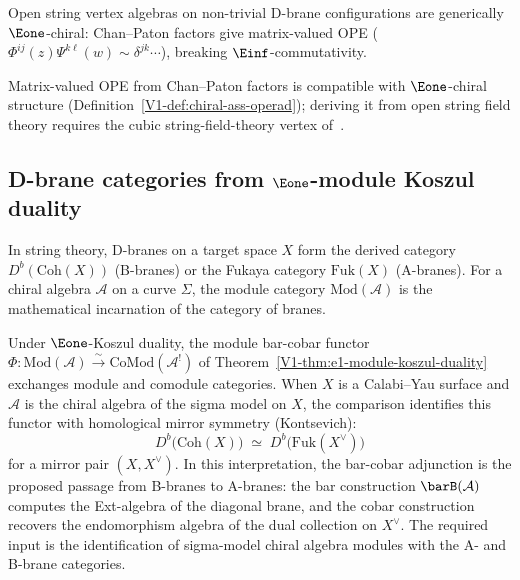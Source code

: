 \begin{remark}
Open string vertex algebras on non-trivial D-brane configurations are generically $\Eone$-chiral: Chan--Paton factors give matrix-valued OPE ($\Phi^{ij}(z)\Psi^{k\ell}(w) \sim \delta^{jk}\cdots$), breaking $\Einf$-commutativity.
\end{remark}

\begin{remark}
Matrix-valued OPE from Chan--Paton factors is compatible with $\Eone$-chiral structure (Definition~\ref*{V1-def:chiral-ass-operad}); deriving it from open string field theory requires the cubic string-field-theory vertex of~\cite{Zwi93}.
\end{remark}


\subsection{\texorpdfstring{D-brane categories from $\Eone$-module Koszul duality}{D-brane categories from E1-module Koszul duality}}

\begin{remark}
In string theory, D-branes on a target space $X$ form the derived category
$D^b(\mathrm{Coh}(X))$ (B-branes) or the Fukaya category $\mathrm{Fuk}(X)$
(A-branes). For a chiral algebra $\mathcal{A}$ on a curve $\Sigma$, the
module category $\mathrm{Mod}(\mathcal{A})$ is the mathematical incarnation
of the category of branes.

Under $\Eone$-Koszul duality, the module bar-cobar functor
$\Phi\colon \mathrm{Mod}(\mathcal{A}) \xrightarrow{\sim}
\mathrm{CoMod}(\mathcal{A}^!)$
of Theorem~\ref*{V1-thm:e1-module-koszul-duality} exchanges module and comodule
categories. When $X$ is a Calabi--Yau surface and $\mathcal{A}$ is the chiral
algebra of the sigma model on $X$, the comparison identifies this
functor with homological mirror symmetry (Kontsevich):
\[
D^b\bigl(\mathrm{Coh}(X)\bigr)
\;\simeq\;
D^b\bigl(\mathrm{Fuk}(X^\vee)\bigr)
\]
for a mirror pair $(X, X^\vee)$. In this interpretation, the bar-cobar
adjunction is the proposed passage from B-branes to A-branes: the bar construction
$\barB(\mathcal{A})$ computes the Ext-algebra of the diagonal brane,
and the cobar construction recovers the endomorphism algebra of the dual
collection on $X^\vee$. The required input is the identification of
sigma-model chiral algebra modules with the A- and B-brane categories.
\end{remark}

